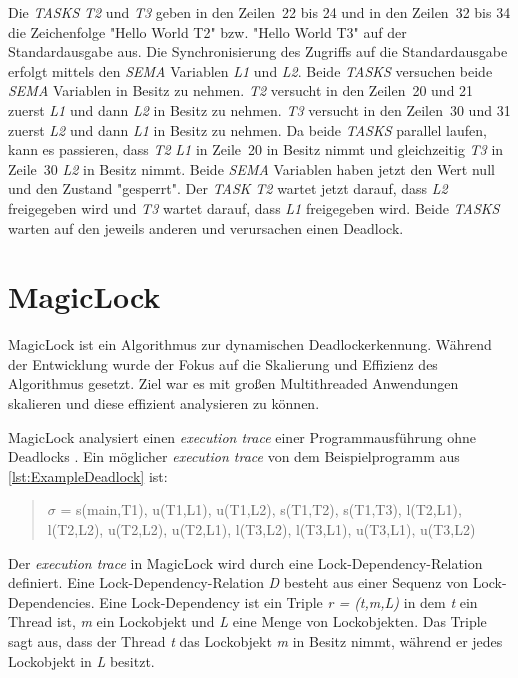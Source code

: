 Die \emph{TASKS} \emph{T2} und \emph{T3} geben in den Zeilen~22 bis 24 und in
den Zeilen~32 bis 34 die Zeichenfolge "Hello World T2" bzw. "Hello World T3" auf
der Standardausgabe aus. Die Synchronisierung des Zugriffs auf die
Standardausgabe erfolgt mittels den \emph{SEMA} Variablen \emph{L1} und
\emph{L2}. Beide \emph{TASKS} versuchen beide \emph{SEMA} Variablen in Besitz zu
nehmen. \emph{T2} versucht in den Zeilen~20 und 21 zuerst \emph{L1} und dann
\emph{L2} in Besitz zu nehmen. \emph{T3} versucht in den Zeilen~30 und 31 zuerst
\emph{L2} und dann \emph{L1} in Besitz zu nehmen. Da beide \emph{TASKS} parallel
laufen, kann es passieren, dass \emph{T2} \emph{L1} in Zeile~20 in Besitz nimmt
und gleichzeitig \emph{T3} in Zeile~30 \emph{L2} in Besitz nimmt. Beide
\emph{SEMA} Variablen haben jetzt den Wert null und den Zustand "gesperrt". Der
\emph{TASK} \emph{T2} wartet jetzt darauf, dass \emph{L2} freigegeben wird und
\emph{T3} wartet darauf, dass \emph{L1} freigegeben wird. Beide \emph{TASKS}
warten auf den jeweils anderen und verursachen einen Deadlock.

\section{MagicLock}
\label{section:MagicLock}
MagicLock ist ein Algorithmus zur dynamischen Deadlockerkennung. Während der
Entwicklung wurde der Fokus auf die Skalierung und Effizienz des Algorithmus
gesetzt. Ziel war es mit großen Multithreaded Anwendungen skalieren und diese
effizient analysieren zu können.\autocite[vgl.][1]{MagicLock}

MagicLock analysiert einen \emph{execution trace} einer Programmausführung ohne
Deadlocks \autocite[vgl.][4]{MagicLock}. Ein möglicher \emph{execution trace}
von dem Beispielprogramm aus \cref{lst:ExampleDeadlock} ist:
\begin{quote}
  \textbf{$\sigma$} = s(main,T1), u(T1,L1), u(T1,L2), s(T1,T2), s(T1,T3),
  l(T2,L1), l(T2,L2), u(T2,L2), u(T2,L1), l(T3,L2), l(T3,L1), u(T3,L1), u(T3,L2)
\end{quote}
Der \emph{execution trace} in MagicLock wird durch eine Lock-Dependency-Relation
definiert. Eine Lock-Dependency-Relation \emph{D} besteht aus einer Sequenz von
Lock-Dependencies. Eine Lock-Dependency ist ein Triple \emph{r = (t,m,L)} in dem
\emph{t} ein Thread ist, \emph{m} ein Lockobjekt und \emph{L} eine Menge von
Lockobjekten. Das Triple sagt aus, dass der Thread \emph{t} das Lockobjekt
\emph{m} in Besitz nimmt, während er jedes Lockobjekt in \emph{L} besitzt.\autocite[vgl.][3]{MagicLock}

